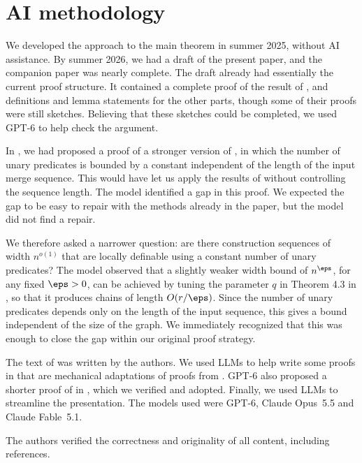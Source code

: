 \section*{AI methodology}
We developed the approach to the main theorem in summer 2025, without AI assistance.
By summer 2026, we had a draft of the present paper, and the companion paper \cite{md-abmw} was nearly complete.
The draft already had essentially the current proof structure.
It contained a complete proof of the result of , and definitions and lemma statements for the other parts, though some of their proofs were still sketches.
Believing that these sketches could be completed, we used GPT-6 to help check the argument.

In , we had proposed a proof of a stronger version of , in which the number of unary predicates is bounded by a constant independent of the length of the input merge sequence.
This would have let us apply the results of \cite{md-abmw} without controlling the sequence length.
The model identified a gap in this proof.
We expected the gap to be easy to repair with the methods already in the paper, but the model did not find a repair.

We therefore asked a narrower question: are there construction sequences of width $n^{o(1)}$ that are locally definable using a constant number of unary predicates?
The model observed that a slightly weaker width bound of $n^\eps$, for any fixed $\eps>0$, can be achieved by tuning the parameter $q$ in Theorem 4.3 in \cite{md-abmw}, so that it produces chains of length $O(r/\eps)$.
Since the number of unary predicates depends only on the length of the input sequence, this gives a bound independent of the size of the graph.
We immediately recognized that this was enough to close the gap within our original proof strategy.

The text of  was written by the authors.
We used LLMs to help write some proofs in  that are mechanical adaptations of proofs from \cite{locality-note}.
GPT-6 also proposed a shorter proof of  in , which we verified and adopted.
Finally, we used LLMs to streamline the presentation.
The models used were GPT-6, Claude Opus~5.5 and Claude Fable~5.1.

The authors verified the correctness and originality of all content, including references.

